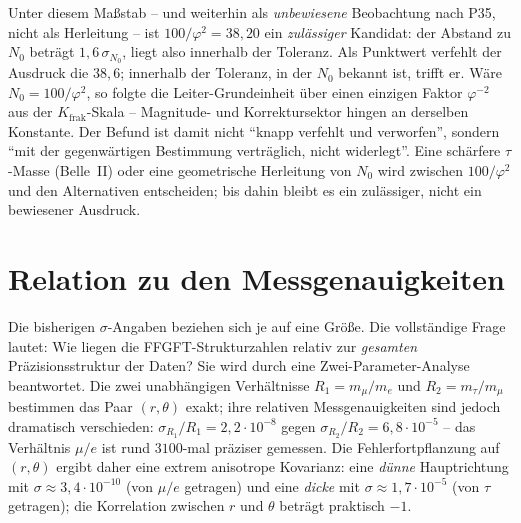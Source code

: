 Unter diesem Maßstab -- und weiterhin als \emph{unbewiesene} Beobachtung
nach P35, nicht als Herleitung -- ist $100/\varphi^2 = 38{,}20$ ein
\emph{zulässiger} Kandidat: der Abstand zu $N_0$ beträgt $1{,}6\,\sigma_{N_0}$,
liegt also innerhalb der Toleranz. Als Punktwert verfehlt der Ausdruck die
$38{,}6$; innerhalb der Toleranz, in der $N_0$ bekannt ist, trifft er. Wäre
$N_0=100/\varphi^2$, so folgte die Leiter-Grundeinheit über einen einzigen
Faktor $\varphi^{-2}$ aus der $K_{\text{frak}}$-Skala -- Magnitude- und
Korrektursektor hingen an derselben Konstante. Der Befund ist damit nicht
\enquote{knapp verfehlt und verworfen}, sondern \enquote{mit der
gegenwärtigen Bestimmung verträglich, nicht widerlegt}. Eine schärfere
$\tau$-Masse (Belle~II) oder eine geometrische Herleitung von $N_0$ wird
zwischen $100/\varphi^2$ und den Alternativen entscheiden; bis dahin bleibt
es ein zulässiger, nicht ein bewiesener Ausdruck.

\section{Relation zu den Messgenauigkeiten}
\label{sec:praezision}
Die bisherigen $\sigma$-Angaben beziehen sich je auf eine Größe. Die
vollständige Frage lautet: Wie liegen die FFGFT-Strukturzahlen relativ zur
\emph{gesamten} Präzisionsstruktur der Daten? Sie wird durch eine
Zwei-Parameter-Analyse beantwortet. Die zwei unabhängigen Verhältnisse
$R_1=m_\mu/m_e$ und $R_2=m_\tau/m_\mu$ bestimmen das Paar $(r,\theta)$
exakt; ihre relativen Messgenauigkeiten sind jedoch dramatisch verschieden:
$\sigma_{R_1}/R_1 = 2{,}2\cdot10^{-8}$ gegen
$\sigma_{R_2}/R_2 = 6{,}8\cdot10^{-5}$ -- das Verhältnis $\mu/e$ ist rund
$3100$-mal präziser gemessen. Die Fehlerfortpflanzung auf $(r,\theta)$
ergibt daher eine extrem anisotrope Kovarianz: eine \emph{dünne}
Hauptrichtung mit $\sigma \approx 3{,}4\cdot10^{-10}$ (von $\mu/e$
getragen) und eine \emph{dicke} mit $\sigma \approx 1{,}7\cdot10^{-5}$
(von $\tau$ getragen); die Korrelation zwischen $r$ und $\theta$ beträgt
praktisch $-1$.

